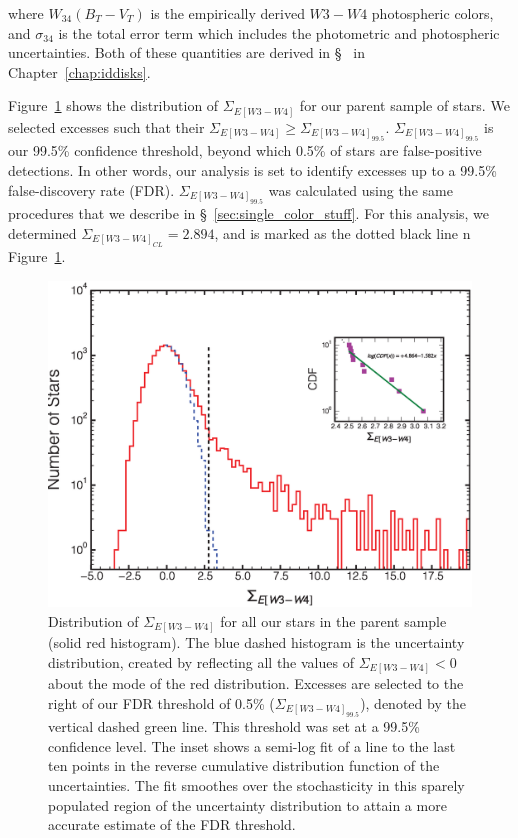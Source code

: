     \noindent where $W_{34}(B_T-V_T)$ is the empirically derived $W3-W4$ photospheric colors, and $\sigma_{34}$ is the total error term which includes the photometric and photospheric uncertainties. Both of these quantities are derived in \S~ in Chapter~\ref{chap:iddisks}. 
    
    Figure~\ref{fig:sige_w3-w4} shows the distribution of $\Sigma_{E[W3-W4]}$ for our parent sample of stars. We selected excesses such that their $\Sigma_{E[W3-W4]} \geq \Sigma_{E[W3-W4]_{99.5}}$. $\Sigma_{E[W3-W4]_{99.5}}$ is our 99.5\% confidence threshold, beyond which 0.5\% of stars are false-positive detections. In other words, our analysis is set to identify excesses up to a 99.5\% false-discovery rate (FDR). $\Sigma_{E[W3-W4]_{99.5}}$ was calculated using the same procedures that we describe in \S~\ref{sec:single_color_stuff}. For this analysis, we determined $\Sigma_{E[W3-W4]_{CL}}=2.894$, and is marked as the dotted black line n Figure~\ref{fig:sige_w3-w4}. 

    \begin{figure}
    \centering
    \includegraphics[width=\textwidth]{Ch5/W3-W4_colordist_removedunwisestars_galplane}
    \caption[Distribution of $\Sigma_{E[W3-W4]}$ in 120~pc]{Distribution of $\Sigma_{E[W3-W4]}$ for all our stars in the parent sample (solid red histogram). The blue dashed histogram is the uncertainty distribution, created by reflecting all the values of $\Sigma_{E[W3-W4]}<0$ about the mode of the red distribution. Excesses are selected to the right of our FDR threshold of 0.5\% ($\Sigma_{E[W3-W4]_{99.5}}$), denoted by the vertical dashed green line. This threshold was set at a 99.5\% confidence level. The inset shows a semi-log fit of a line to the last ten points in the reverse cumulative distribution function of the uncertainties. The fit smoothes over the stochasticity in this sparely populated region of the uncertainty distribution to attain a more accurate estimate of the FDR threshold.}
    \label{fig:sige_w3-w4}
    \end{figure}

